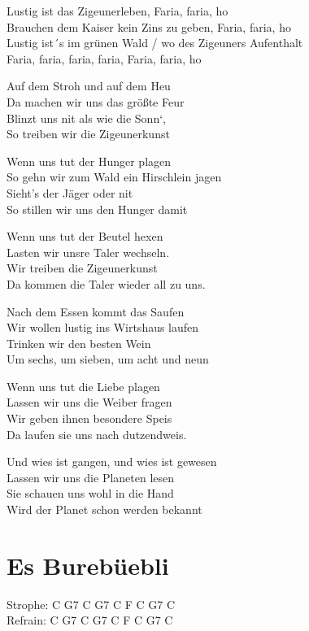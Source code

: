 \documentclass[
  letterpaper,
  twoside=false]{scrbook}
\begin{document}
Lustig ist das Zigeunerleben, Faria, faria, ho\\
Brauchen dem Kaiser kein Zins zu geben, Faria, faria, ho\\
Lustig ist´s im grünen Wald / wo des Zigeuners Aufenthalt\\
Faria, faria, faria, faria, Faria, faria, ho

Auf dem Stroh und auf dem Heu\\
Da machen wir uns das größte Feur\\
Blinzt uns nit als wie die Sonn`,\\
So treiben wir die Zigeunerkunst

Wenn uns tut der Hunger plagen\\
So gehn wir zum Wald ein Hirschlein jagen\\
Sieht's der Jäger oder nit\\
So stillen wir uns den Hunger damit

Wenn uns tut der Beutel hexen\\
Lasten wir unsre Taler wechseln.\\
Wir treiben die Zigeunerkunst\\
Da kommen die Taler wieder all zu uns.

Nach dem Essen kommt das Saufen\\
Wir wollen lustig ins Wirtshaus laufen\\
Trinken wir den besten Wein\\
Um sechs, um sieben, um acht und neun

Wenn uns tut die Liebe plagen\\
Lassen wir uns die Weiber fragen\\
Wir geben ihnen besondere Speis\\
Da laufen sie uns nach dutzendweis.

Und wies ist gangen, und wies ist gewesen\\
Lassen wir uns die Planeten lesen\\
Sie schauen uns wohl in die Hand\\
Wird der Planet schon werden bekannt

\hypertarget{es-burebuxfcebli}{%
\chapter{Es Burebüebli}\label{es-burebuxfcebli}}

Strophe: C G7 C G7 C F C G7 C\\
Refrain: C G7 C G7 C F C G7 C
\end{document}
